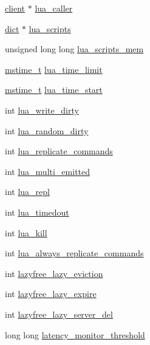\begin{DoxyCompactItemize}
\hyperlink{structclient}{client} $\ast$ \hyperlink{structredis_server_a358f45ac0e9b0130b7bef78e34537106}{lua\+\_\+caller}
\item 
\hyperlink{structdict}{dict} $\ast$ \hyperlink{structredis_server_a7f3d3d90cccad86c685008f3f02492fe}{lua\+\_\+scripts}
\item 
unsigned long long \hyperlink{structredis_server_a412e66c4f2ef9fdb6601bcc2e09b5da9}{lua\+\_\+scripts\+\_\+mem}
\item 
\hyperlink{redismodule_8h_a652ae61e2475bc8957454534544968fc}{mstime\+\_\+t} \hyperlink{structredis_server_a0ee11cd40096c9b2be4753c10113db7d}{lua\+\_\+time\+\_\+limit}
\item 
\hyperlink{redismodule_8h_a652ae61e2475bc8957454534544968fc}{mstime\+\_\+t} \hyperlink{structredis_server_a9a42f59c5d930ed9816e67c3feb38807}{lua\+\_\+time\+\_\+start}
\item 
int \hyperlink{structredis_server_a74bf8a5fcf2bb65e2efc4d6b8a9085da}{lua\+\_\+write\+\_\+dirty}
\item 
int \hyperlink{structredis_server_ace94217c2aba45821ed2283269f12cd4}{lua\+\_\+random\+\_\+dirty}
\item 
int \hyperlink{structredis_server_aa0db2d41d070ec4ddc5b4b44f0927f94}{lua\+\_\+replicate\+\_\+commands}
\item 
int \hyperlink{structredis_server_abf8fc7ed7008ccb1bb2ea176853c8f1a}{lua\+\_\+multi\+\_\+emitted}
\item 
int \hyperlink{structredis_server_a9d0bfd8abb30771a52424ba960fc5a5b}{lua\+\_\+repl}
\item 
int \hyperlink{structredis_server_afce7261d2fd1519a835614d28df5afb5}{lua\+\_\+timedout}
\item 
int \hyperlink{structredis_server_a32bd0732216941887e0244f584f5ddb8}{lua\+\_\+kill}
\item 
int \hyperlink{structredis_server_a1bdb308c6148667ad72670aa18d883ba}{lua\+\_\+always\+\_\+replicate\+\_\+commands}
\item 
int \hyperlink{structredis_server_aa2a751d9d0430a065d573c0adafdb90b}{lazyfree\+\_\+lazy\+\_\+eviction}
\item 
int \hyperlink{structredis_server_a192b9c651f47c1e7e927b0c6c2620952}{lazyfree\+\_\+lazy\+\_\+expire}
\item 
int \hyperlink{structredis_server_a7d2a15a8dbe14095038ad527dea866d5}{lazyfree\+\_\+lazy\+\_\+server\+\_\+del}
\item 
long long \hyperlink{structredis_server_a73ce15b906abae61ce26fda115af09e4}{latency\+\_\+monitor\+\_\+threshold}

\end{DoxyCompactItemize}
